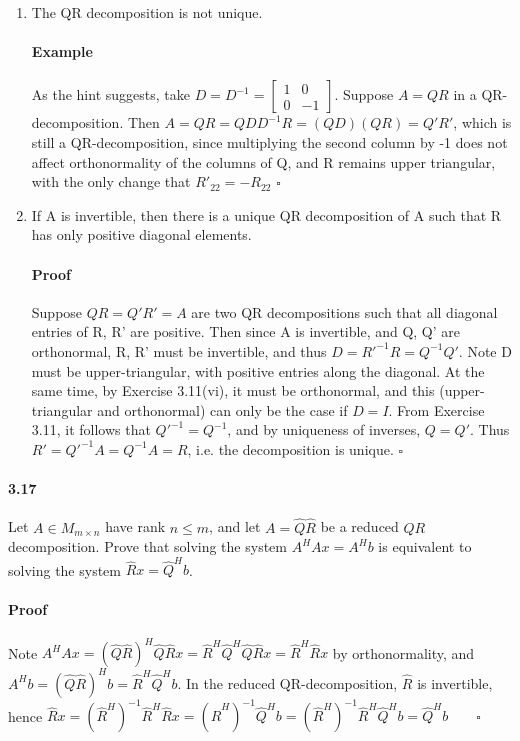 \documentclass[letterpaper,12pt]{article}
\theoremstyle{definition}
\begin{document}
\begin{enumerate}[label=(\roman*)]

\item The QR decomposition is not unique.
\paragraph{Example} As the hint suggests, take $D = D^{-1} = \begin{bmatrix}
    1 & 0 \\
    0 & -1 
  \end{bmatrix} $. Suppose $A = QR$ in a QR-decomposition. Then
  $A = QR = QDD^{-1}R = (QD)(QR) = Q'R'$, which is still a QR-decomposition, since multiplying the second column by -1 does not affect orthonormality of the columns of Q, and R remains upper triangular, with the only change that $R'_{22} = -R_{22}$ $\square$

\item If A is invertible, then there is a unique QR decomposition of A such that R has only positive diagonal elements.

\paragraph{Proof} Suppose $QR = Q'R' =  A$ are two QR decompositions such that all diagonal entries of R, R' are positive. Then since A is invertible, and Q, Q' are orthonormal, R, R' must be invertible, and thus $D = R'^{-1}R = Q^{-1}Q'$. Note D must be upper-triangular, with positive entries along the diagonal. At the same time, by Exercise 3.11(vi), it must be orthonormal, and this (upper-triangular and orthonormal) can only be the case if $D = I$.  From Exercise 3.11, it follows that $Q'^{-1} =  Q^{-1}$, and by uniqueness of inverses, $Q = Q'$. Thus $R' = Q'^{-1}A =  Q^{-1}A = R$, i.e. the decomposition is unique. $\square$

\end{enumerate}


\paragraph{3.17} Let $A \in M_{m \times n}$ have rank $n \le m$, and let $A =  \hat{Q}\hat{R}$ be a reduced $QR$ decomposition. Prove that solving the system $A^HAx = A^Hb$ is equivalent to solving the system $\hat{R} x = \hat{Q}^H b$.
\paragraph{Proof} Note $A^HAx = (\hat{Q}\hat{R})^H\hat{Q}\hat{R}x = \hat{R}^H\hat{Q}^H\hat{Q}\hat{R}x = \hat{R}^H\hat{R}x$ by orthonormality, and 
$A^Hb = (\hat{Q}\hat{R})^Hb =\hat{R}^H\hat{Q}^Hb$. In the reduced QR-decomposition, $\hat{R}$ is invertible, hence  
$\hat{R} x = (\hat{R}^H)^{-1} \hat{R}^H\hat{R}x = (\hat{R}^H)^{-1} \hat{Q}^H b = (\hat{R}^H)^{-1}\hat{R}^H\hat{Q}^Hb = \hat{Q}^Hb \qquad \square$
\end{document}
